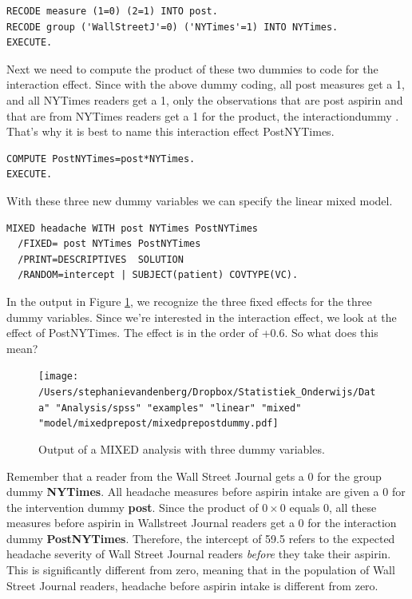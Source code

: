 \documentclass[]{report}\usepackage[]{graphicx}\usepackage[]{color}
\begin{document}
\begin{verbatim}
RECODE measure (1=0) (2=1) INTO post.
RECODE group ('WallStreetJ'=0) ('NYTimes'=1) INTO NYTimes.
EXECUTE.
\end{verbatim}

Next we need to compute the product of these two dummies to code for the interaction effect. Since with the above dummy coding, all post measures get a 1, and all NYTimes readers get a 1, only the observations that are post aspirin and that are from NYTimes readers get a 1 for the product, the interactiondummy . That's why it is best to name this interaction effect PostNYTimes. 

\begin{verbatim}
COMPUTE PostNYTimes=post*NYTimes.
EXECUTE.
\end{verbatim}

With these three new dummy variables we can specify the linear mixed model.

\begin{verbatim}
MIXED headache WITH post NYTimes PostNYTimes
  /FIXED= post NYTimes PostNYTimes
  /PRINT=DESCRIPTIVES  SOLUTION
  /RANDOM=intercept | SUBJECT(patient) COVTYPE(VC).
\end{verbatim}


In the output in Figure \ref{fig:mixedprepostdummy}, we recognize the three fixed effects for the three dummy variables. Since we're interested in the interaction effect, we look at the effect of PostNYTimes. The effect is in the order of +0.6. So what does this mean? 

\begin{figure}[h]
    \begin{center}
       \texttt{[image: /Users/stephanievandenberg/Dropbox/Statistiek\_Onderwijs/Data" "Analysis/spss" "examples" "linear" "mixed" "model/mixedprepost/mixedprepostdummy.pdf]}
    \end{center}
    \label{fig:mixedprepostdummy}
    \caption{Output of a MIXED analysis with three dummy variables.}
\end{figure}



Remember that a reader from the Wall Street Journal gets a 0 for the group dummy \textbf{NYTimes}. All headache measures before aspirin intake are given a 0 for the intervention dummy \textbf{post}. 
Since the product of $ 0\times 0$ equals 0, all these measures before aspirin in Wallstreet Journal readers get a 0 for the interaction dummy \textbf{PostNYTimes}.
Therefore, the intercept of 59.5 refers to the expected headache severity of Wall Street Journal readers \textit{before} they take their aspirin. This is significantly different from zero, meaning that in the population of Wall Street Journal readers, headache before aspirin intake is different from zero.
\end{document}
